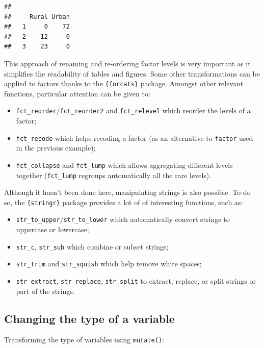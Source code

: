 \documentclass[
]{book}
\providecommand{\tightlist}{%
  \setlength{\itemsep}{0pt}\setlength{\parskip}{0pt}}
\begin{document}
\begin{verbatim}
##    
##     Rural Urban
##   1     0    72
##   2    12     0
##   3    23     0
\end{verbatim}

This approach of renaming and re-ordering factor levels is very important as it simplifies the readability of tables and figures.
Some other transformations can be applied to factors thanks to the \texttt{\{forcats\}} package. Amongst other relevant functions, particular attention can be given to:

\begin{itemize}
\tightlist
\item
  \texttt{fct\_reorder}/\texttt{fct\_reorder2} and \texttt{fct\_relevel} which reorder the levels of a factor;
\item
  \texttt{fct\_recode} which helps recoding a factor (as an alternative to \texttt{factor} used in the previous example);
\item
  \texttt{fct\_collapse} and \texttt{fct\_lump} which allows aggregating different levels together (\texttt{fct\_lump} regroups automatically all the rare levels).
\end{itemize}

Although it hasn't been done here, manipulating strings is also possible. To do so, the \texttt{\{stringr\}} package provides a lot of of interesting functions, such as:

\begin{itemize}
\tightlist
\item
  \texttt{str\_to\_upper}/\texttt{str\_to\_lower} which automatically convert strings to uppercase or lowercase;
\item
  \texttt{str\_c}, \texttt{str\_sub} which combine or subset strings;
\item
  \texttt{str\_trim} and \texttt{str\_squish} which help remove white spaces;
\item
  \texttt{str\_extract}, \texttt{str\_replace}, \texttt{str\_split} to extract, replace, or split strings or part of the strings.
\end{itemize}

\hypertarget{changing-the-type-of-a-variable}{%
\subsection{Changing the type of a variable}\label{changing-the-type-of-a-variable}}

Transforming the type of variables using \texttt{mutate()}:
\end{document}
